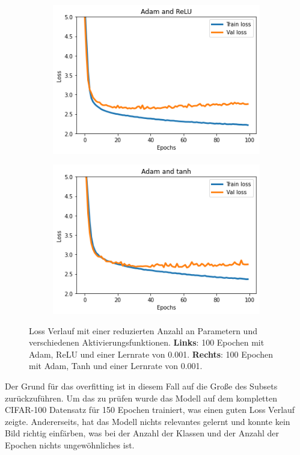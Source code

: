 \begin{figure}[H]
  \centering
  \vspace{1cm}
  \begin{subfigure}
    \centering
    \includegraphics[width=.48\textwidth]{resources/experiments/cifar-adam-relu.png}
  \end{subfigure}
  \begin{subfigure}
    \centering
    \includegraphics[width=.48\textwidth]{resources/experiments/cifar-adam-tanh-100.png}
  \end{subfigure}

  \caption{Loss Verlauf mit einer reduzierten Anzahl an Parametern und verschiedenen Aktivierungsfunktionen. 
  \textbf{Links}: 100 Epochen mit Adam, ReLU und einer Lernrate von 0.001. \textbf{Rechts}: 100 Epochen mit Adam, Tanh und einer Lernrate von 0.001.}
  \label{image:gute-ergebnisse-cifar}
\end{figure}

Der Grund für das \gls{overfitting} ist in diesem Fall auf die Große des Subsets zurückzuführen. Um das zu prüfen wurde das Modell auf dem kompletten CIFAR-100
Datensatz für 150 Epochen trainiert, was einen guten Loss Verlauf zeigte. Andererseits, hat das Modell nichts relevantes gelernt und 
konnte kein Bild richtig einfärben, was bei der Anzahl der Klassen und der Anzahl der Epochen nichts ungewöhnliches ist.

